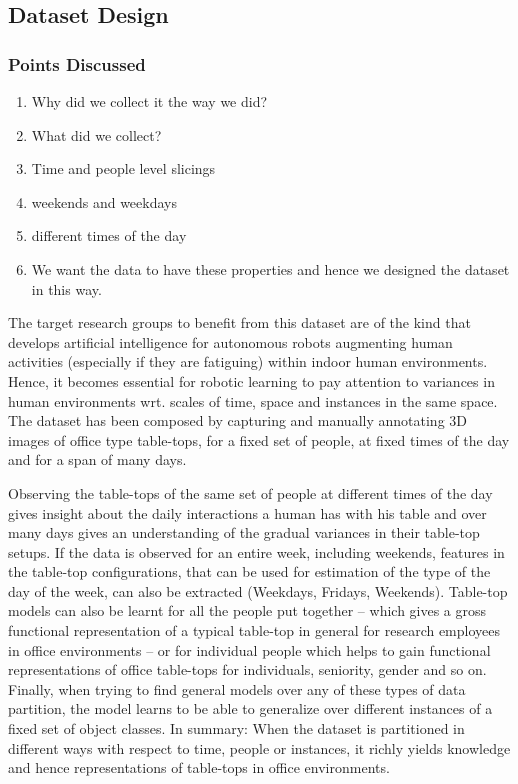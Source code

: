 \documentclass[letterpaper, 10 pt, conference]{ieeeconf}  %
\begin{document}
\subsection{Dataset Design}

\subsubsection*{Points Discussed}
\begin{enumerate}
	\item Why did we collect it the way we did?
	\item What did we collect?
	\item Time and people level slicings
	\item weekends and weekdays
	\item different times of the day
	\item We want the data to have these properties and hence we designed the dataset in this way.
\end{enumerate}
The target research groups to benefit from this dataset are of the kind that develops artificial intelligence for autonomous robots augmenting human activities (especially if they are fatiguing) within indoor human environments. Hence, it becomes essential for robotic learning to pay attention to variances in human environments wrt. scales of time, space and instances in the same space. The dataset has been composed by capturing and manually annotating 3D images of office type table-tops, for a fixed set of people, at fixed times of the day and for a span of many days.

Observing the table-tops of the same set of people at different times of the day gives insight about the daily interactions a human has with his table and over many days gives an understanding of the gradual variances in their table-top setups. If the data is observed for an entire week, including weekends, features in the table-top configurations, that can be used for estimation of the type of the day of the week, can also be extracted (Weekdays, Fridays, Weekends). Table-top models can also be learnt for all the people put together -- which gives a gross functional representation of a typical table-top in general for research employees in office environments -- or for individual people which helps to gain functional representations of office table-tops for individuals, seniority, gender and so on. Finally, when trying to find general models over any of these types of data partition, the model learns to be able to generalize over different instances of a fixed set of object classes. In summary: When the dataset is partitioned in different ways with respect to time, people or instances, it richly yields knowledge and hence representations of table-tops in office environments.
\end{document}
